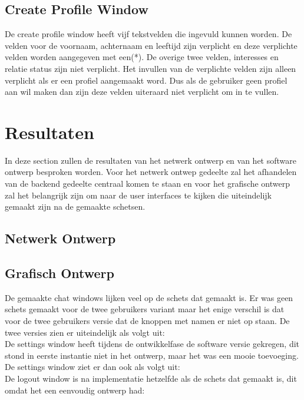 \documentclass[12pt]{article}
\begin{document}
\subsection*{Create Profile Window}
\label{CPW}
De create profile window heeft vijf tekstvelden die ingevuld kunnen worden. De velden voor de voornaam, achternaam en leeftijd zijn verplicht en deze verplichte velden worden aangegeven met een(*). De overige twee velden, interesses en relatie status zijn niet verplicht. Het invullen van de verplichte velden zijn alleen verplicht als er een profiel aangemaakt word. Dus als de gebruiker geen profiel aan wil maken dan zijn deze velden uiteraard niet verplicht om in te vullen. 
\newpage

\section{Resultaten}
In deze section zullen de resultaten van het netwerk ontwerp en van het software ontwerp besproken worden. Voor het netwerk ontwep gedeelte zal het afhandelen van de backend gedeelte centraal komen te staan en voor het grafische ontwerp zal het belangrijk zijn om naar de user interfaces te kijken die uiteindelijk gemaakt zijn na de gemaakte schetsen. 

\subsection{Netwerk Ontwerp}

\subsection{Grafisch Ontwerp}
De gemaakte chat windows lijken veel op de schets dat gemaakt is. Er was geen schets gemaakt voor de twee gebruikers variant maar het enige verschil is dat voor de twee gebruikers versie dat de knoppen met namen er niet op staan. De twee versies zien er uiteindelijk als volgt uit:
\\

\noindent De settings window heeft tijdens de ontwikkelfase de software versie gekregen, dit stond in eerste instantie niet in het ontwerp, maar het was een mooie toevoeging. De settings window ziet er dan ook als volgt uit:
\\

\noindent De logout window is na implementatie hetzelfde als de schets dat gemaakt is, dit omdat het een eenvoudig ontwerp had:
\\
\end{document}
